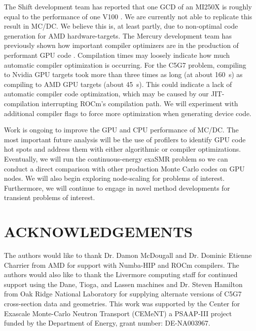 The Shift development team has reported that one GCD of an MI250X is roughly equal to the performance of one V100 \cite{mcsummit}.
We are currently not able to replicate this result in MC/DC.
We believe this is, at least partly, due to non-optimal code generation for AMD hardware-targets.
The Mercury development team has previously shown how important compiler optimizers are in the production of performant GPU code \cite{pozulp_progress_2023}.
Compilation times may loosely indicate how much automatic compiler optimization is occurring.
For the C5G7 problem, compiling to Nvidia GPU targets took more than three times as long (at about \SI{160}{s}) as compiling to AMD GPU targets (about \SI{45}{s}).
This could indicate a lack of automatic compiler code optimization, which may be caused by our JIT-compilation interrupting ROCm's compilation path.
We will experiment with additional compiler flags to force more optimization when generating device code.



Work is ongoing to improve the GPU and CPU performance of MC/DC.
The most important future analysis will be the use of profilers to identify GPU code hot spots and address them with either algorithmic or compiler optimizations.
Eventually, we will run the continuous-energy exaSMR problem so we can conduct a direct comparison with other production Monte Carlo codes on GPU nodes.
We will also begin exploring node-scaling for problems of interest.
Furthermore, we will continue to engage in novel method developments for transient problems of interest.


\section*{ACKNOWLEDGEMENTS}
The authors would like to thank Dr. Damon McDougall and Dr. Dominic Etienne Charrier from AMD for support with Numba-HIP and ROCm compilers.
The authors would also like to thank the Livermore computing staff for continued support using the Dane, Tioga, and Lassen machines and Dr. Steven Hamilton from Oak Ridge National Laboratory for supplying alternate versions of C5G7 cross-section data and geometries.
This work was supported by the Center for Exascale Monte-Carlo Neutron Transport (CEMeNT) a PSAAP-III project funded by the Department of Energy, grant number: DE-NA003967.